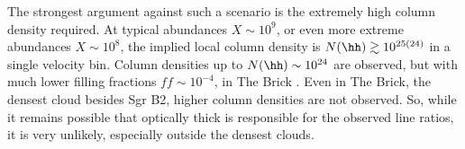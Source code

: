 The strongest argument against such a scenario is the extremely high column
density required.  At typical \para abundances $X\sim10^9$, or even more
extreme abundances $X\sim10^8$, the implied local column density is
$N(\hh)\gtrsim10^{25(24)}$ in a single velocity bin.  Column densities up to
$N(\hh)\sim10^{24}$ \percc are observed, but with much lower filling fractions
$ff\sim10^{-4}$, in The Brick \citep[][Figure 4]{Rathborne2014a}.  Even in The
Brick, the densest cloud besides Sgr B2, higher column densities are not
observed.  So, while it remains possible that optically thick \para is
responsible for the observed line ratios, it is very unlikely, especially
outside the densest clouds.






